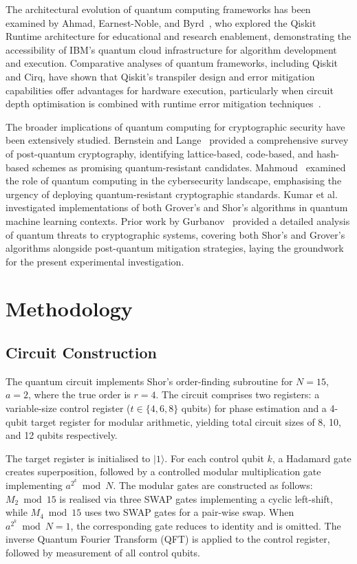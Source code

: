 \documentclass[conference]{IEEEtran}
\begin{document}
The architectural evolution of quantum computing frameworks has been examined by Ahmad, Earnest-Noble, and Byrd~\cite{b5}, who explored the Qiskit Runtime architecture for educational and research enablement, demonstrating the accessibility of IBM's quantum cloud infrastructure for algorithm development and execution. Comparative analyses of quantum frameworks, including Qiskit and Cirq, have shown that Qiskit's transpiler design and error mitigation capabilities offer advantages for hardware execution, particularly when circuit depth optimisation is combined with runtime error mitigation techniques~\cite{b5}.

The broader implications of quantum computing for cryptographic security have been extensively studied. Bernstein and Lange~\cite{b2} provided a comprehensive survey of post-quantum cryptography, identifying lattice-based, code-based, and hash-based schemes as promising quantum-resistant candidates. Mahmoud~\cite{b6} examined the role of quantum computing in the cybersecurity landscape, emphasising the urgency of deploying quantum-resistant cryptographic standards. Kumar et al.~\cite{b7} investigated implementations of both Grover's and Shor's algorithms in quantum machine learning contexts. Prior work by Gurbanov~\cite{b8} provided a detailed analysis of quantum threats to cryptographic systems, covering both Shor's and Grover's algorithms alongside post-quantum mitigation strategies, laying the groundwork for the present experimental investigation.

\section{Methodology}

\subsection{Circuit Construction}

The quantum circuit implements Shor's order-finding subroutine for $N=15$, $a=2$, where the true order is $r=4$. The circuit comprises two registers: a variable-size control register ($t \in \{4, 6, 8\}$ qubits) for phase estimation and a 4-qubit target register for modular arithmetic, yielding total circuit sizes of 8, 10, and 12 qubits respectively.

The target register is initialised to $|1\rangle$. For each control qubit $k$, a Hadamard gate creates superposition, followed by a controlled modular multiplication gate implementing $a^{2^k} \bmod N$. The modular gates are constructed as follows: $M_2 \bmod 15$ is realised via three SWAP gates implementing a cyclic left-shift, while $M_4 \bmod 15$ uses two SWAP gates for a pair-wise swap. When $a^{2^k} \bmod N = 1$, the corresponding gate reduces to identity and is omitted. The inverse Quantum Fourier Transform (QFT) is applied to the control register, followed by measurement of all control qubits.
\end{document}
